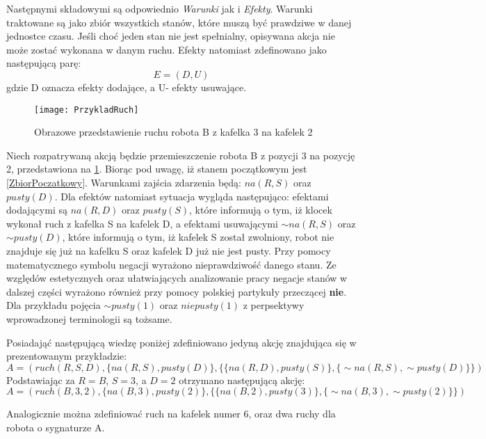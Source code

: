     Następnymi składowymi są odpowiednio \textit{Warunki} jak i \textit{Efekty}. Warunki traktowane są jako zbiór wszystkich stanów, które muszą być 
    prawdziwe w danej jednostce czasu. Jeśli choć jeden stan nie jest spełnialny, opisywana akcja nie może zostać wykonana w danym ruchu.
    Efekty natomiast zdefinowano jako następującą parę:
    \begin{equation}
        E=(D,U)
    \end{equation}
    gdzie D oznacza efekty dodające, a U- efekty usuwające.
    \begin{figure}[H]
        \texttt{[image: PrzykladRuch]}
        \centering
        \caption{Obrazowe przedstawienie ruchu robota B z kafelka 3 na kafelek 2}
        \label{PrzykladRuch}
    \end{figure}
    Niech rozpatrywaną akcją będzie przemieszczenie robota B z pozycji 3 na pozycję 2,
    przedstawiona na \ref{PrzykladRuch}. Biorąc pod uwagę, iż stanem początkowym jest \ref{ZbiorPoczatkowy}. Warunkami zajścia zdarzenia
    będą: $na(R,S)$ oraz $pusty(D)$. Dla efektów natomiast sytuacja wygląda następująco: efektami dodającymi są $na(R,D)$ oraz $pusty(S)$, które informują o tym, iż klocek 
    wykonał ruch z kafelka S na kafelek D, a efektami usuwającymi $\sim na(R,S)$ oraz $\sim pusty(D)$, które informują o tym, iż kafelek S został zwolniony, 
    robot nie znajduje się już na kafelku S oraz kafelek D już nie jest pusty. 
    Przy pomocy matematycznego symbolu negacji wyrażono nieprawdziwość danego stanu. Ze względów estetycznych 
    oraz ułatwiających analizowanie pracy negacje stanów w dalszej części wyrażono również przy pomocy polskiej partykuły przeczącej \textbf{nie}. 
    Dla przykładu pojęcia $\sim pusty(1)$ oraz $niepusty(1)$ z perpsektywy wprowadzonej terminologii są tożsame. 

        Posiadająć następującą wiedzę poniżej zdefiniowano jedyną akcję znajdująca się w prezentowanym przykładzie:
    \begin{equation}
        \label{Ruch}
        A=(ruch(R,S,D),\{na(R,S),pusty(D)\},\{\{na(R,D),pusty(S)\},\{ \sim na(R,S),\sim pusty(D)\}\})
    \end{equation}
    Podstawiając za $R=B$, $S=3$, a $D=2$ otrzymano następującą akcję:
    \begin{equation}
        A=(ruch(B,3,2),\{na(B,3),pusty(2)\},\{\{na(B,2),pusty(3)\},\{ \sim na(B,3),\sim pusty(2)\}\})
    \end{equation}
    
    Analogicznie można zdefiniować ruch na kafelek numer 6, oraz dwa ruchy dla robota o sygnaturze A.


